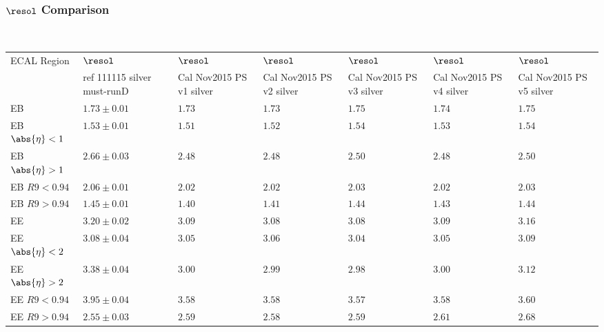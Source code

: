 \documentclass[8pt,serif]{beamer}
\begin{document}
\begin{frame}
  \frametitle{$\resol $ Comparison}
\\


  
  \begin{center}
    \emph{\dataSample}\xspace \invMassVarName

\tiny \begin{tabular}{|l|p{30pt}|p{18pt}|p{18pt}|p{18pt}|p{18pt}|p{18pt}|} \hline  
ECAL Region &  $\resol$ &  $\resol$ &  $\resol$ &  $\resol$ &  $\resol$ &  $\resol$ \\ 
 &  ref 111115 silver must-runD &  Cal Nov2015 PS v1 silver &  Cal Nov2015 PS v2 silver &  Cal Nov2015 PS v3 silver &  Cal Nov2015 PS v4 silver &  Cal Nov2015 PS v5 silver \\ 
\hline           
EB & $1.73 \pm 0.01$ & $1.73$ & $1.73$ & $1.75$ & $1.74$ & $1.75$ \\
EB $\abs{\eta} < 1$ & $1.53 \pm 0.01$ & $1.51$ & $1.52$ & $1.54$ & $1.53$ & $1.54$ \\
EB $\abs{\eta} > 1$ & $2.66 \pm 0.03$ & $2.48$ & $2.48$ & $2.50$ & $2.48$ & $2.50$ \\
EB $R9 < 0.94$ & $2.06 \pm 0.01$ & $2.02$ & $2.02$ & $2.03$ & $2.02$ & $2.03$ \\
EB $R9 > 0.94$ & $1.45 \pm 0.01$ & $1.40$ & $1.41$ & $1.44$ & $1.43$ & $1.44$ \\
EE & $3.20 \pm 0.02$ & $3.09$ & $3.08$ & $3.08$ & $3.09$ & $3.16$ \\
EE $\abs{\eta} < 2$ & $3.08 \pm 0.04$ & $3.05$ & $3.06$ & $3.04$ & $3.05$ & $3.09$ \\
EE $\abs{\eta} > 2$ & $3.38 \pm 0.04$ & $3.00$ & $2.99$ & $2.98$ & $3.00$ & $3.12$ \\
EE $R9 < 0.94$ & $3.95 \pm 0.04$ & $3.58$ & $3.58$ & $3.57$ & $3.58$ & $3.60$ \\
EE $R9 > 0.94$ & $2.55 \pm 0.03$ & $2.59$ & $2.58$ & $2.59$ & $2.61$ & $2.68$ \\
\hline  
\end{tabular} 
  \end{center}


\end{frame}

\end{document}
